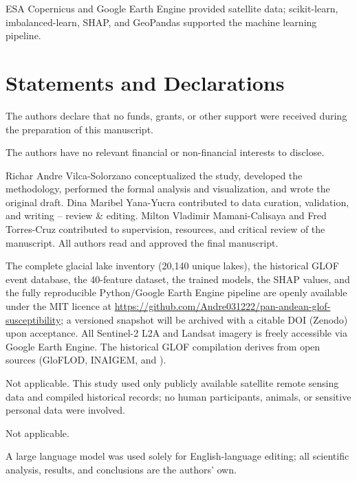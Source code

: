 \documentclass[pdflatex,sn-basic]{sn-jnl}%
\begin{document}
ESA Copernicus and Google Earth Engine \citep{Gorelick2017} provided
satellite data; scikit-learn, imbalanced-learn, SHAP, and GeoPandas
supported the machine learning pipeline.

\section*{Statements and Declarations}

The authors declare that no funds, grants, or other support were received
during the preparation of this manuscript.

The authors have no relevant financial or non-financial interests to
disclose.

Richar Andre Vilca-Solorzano conceptualized the study, developed the
methodology, performed the formal analysis and visualization, and wrote the
original draft. Dina Maribel Yana-Yucra contributed to data curation,
validation, and writing -- review \& editing. Milton Vladimir
Mamani-Calisaya and Fred Torres-Cruz contributed to supervision, resources,
and critical review of the manuscript. All authors read and approved the
final manuscript.

The complete glacial lake inventory (20{,}140 unique lakes), the historical
GLOF event database, the 40-feature dataset, the trained models, the SHAP
values, and the fully reproducible Python/Google Earth Engine pipeline are
openly available under the MIT licence at
\url{https://github.com/Andre031222/pan-andean-glof-susceptibility}; a
versioned snapshot will be archived with a citable DOI (Zenodo) upon
acceptance. All Sentinel-2 L2A and Landsat imagery is freely accessible via
Google Earth Engine. The historical GLOF compilation derives from open
sources (GloFLOD, INAIGEM, and \citet{Emmer2022}).

Not applicable. This study used only publicly available satellite remote
sensing data and compiled historical records; no human participants,
animals, or sensitive personal data were involved.

Not applicable.

A large language model was used solely for English-language editing;
all scientific analysis, results, and conclusions are the authors' own.
\end{document}
